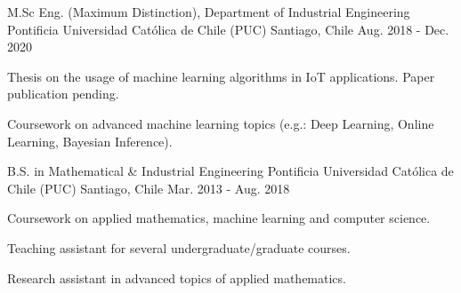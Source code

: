 

\begin{cventries}
\cventry
{M.Sc Eng. (Maximum Distinction), Department of Industrial Engineering} %
{Pontificia Universidad Católica de Chile (PUC)} %
{Santiago, Chile} %
{Aug. 2018 - Dec. 2020} %
{
  \begin{cvitems} %
    \item {Thesis on the usage of machine learning algorithms in IoT applications. Paper publication pending.}
    \item {Coursework on advanced machine learning topics (e.g.: Deep Learning, Online Learning, Bayesian Inference).}
  \end{cvitems}
}

  \cventry
    {B.S. in Mathematical \& Industrial Engineering} %
    {Pontificia Universidad Católica de Chile (PUC)} %
    {Santiago, Chile} %
    {Mar. 2013 - Aug. 2018} %
    {
      \begin{cvitems} %
        \item {Coursework on applied mathematics, machine learning and computer science.}
        \item {Teaching assistant for several undergraduate/graduate courses.}
        \item {Research assistant in advanced topics of applied mathematics.}
      \end{cvitems}
    }

\end{cventries}
